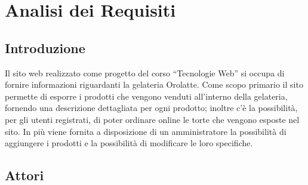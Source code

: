 \section{Analisi dei Requisiti}
    \subsection{Introduzione}
		Il sito web realizzato come progetto del corso “Tecnologie Web” si occupa di fornire informazioni riguardanti la gelateria Orolatte.
		Come scopo primario il sito permette di esporre i prodotti che vengono venduti all’interno della gelateria, fornendo una descrizione dettagliata per ogni prodotto; inoltre c’è la possibilità, per gli utenti registrati,  di poter ordinare online le torte che vengono esposte nel sito.
		In più viene fornita a disposizione di un amministratore la possibilità di aggiungere i prodotti e la possibilità di modificare le loro specifiche.
    \subsection{Attori}

